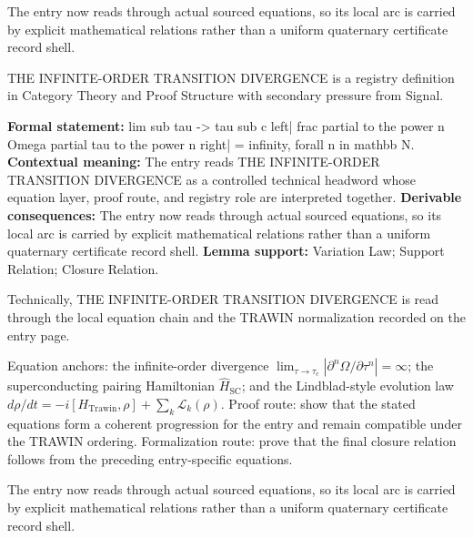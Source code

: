 The entry now reads through actual sourced equations, so its local arc is carried by explicit mathematical relations rather than a uniform quaternary certificate record shell.
\clearpage


\begingroup\small
{}
THE INFINITE-ORDER TRANSITION DIVERGENCE is a registry definition in Category Theory and Proof Structure with secondary pressure from Signal.

\begingroup\footnotesize\setlength{\emergencystretch}{3em}\sloppy
\textbf{Formal statement:} lim sub tau -> tau sub c left| frac partial to the power n Omega partial tau to the power n right| = infinity, forall n in mathbb N. \textbf{Contextual meaning:} The entry reads THE INFINITE-ORDER TRANSITION DIVERGENCE as a controlled technical headword whose equation layer, proof route, and registry role are interpreted together. \textbf{Derivable consequences:} The entry now reads through actual sourced equations, so its local arc is carried by explicit mathematical relations rather than a uniform quaternary certificate record shell. \textbf{Lemma support:} Variation Law; Support Relation; Closure Relation.\par
\endgroup

Technically, THE INFINITE-ORDER TRANSITION DIVERGENCE is read through the local equation chain and the TRAWIN normalization recorded on the entry page.

Equation anchors: the infinite-order divergence \(\lim_{\tau\to\tau_c}\left|\partial^n\Omega/\partial\tau^n\right|=\infty\); the superconducting pairing Hamiltonian \(\widehat{H}_{\mathrm{SC}}\); and the Lindblad-style evolution law \(d\rho/dt=-i[H_{\mathrm{Trawin}},\rho]+\sum_k\mathcal{L}_k(\rho)\). Proof route: show that the stated equations form a coherent progression for the entry and remain compatible under the TRAWIN ordering. Formalization route: prove that the final closure relation follows from the preceding entry-specific equations.

The entry now reads through actual sourced equations, so its local arc is carried by explicit mathematical relations rather than a uniform quaternary certificate record shell.
\endgroup


